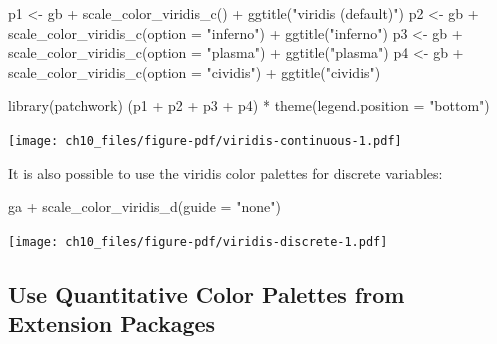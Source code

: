 \documentclass[
  letterpaper,
  DIV=11,
  numbers=noendperiod]{scrreprt}
\newenvironment{Shaded}{\begin{snugshade}}{\end{snugshade}}
\newcommand{\AttributeTok}[1]{\textcolor[rgb]{0.40,0.45,0.13}{#1}}
\newcommand{\FunctionTok}[1]{\textcolor[rgb]{0.28,0.35,0.67}{#1}}
\newcommand{\NormalTok}[1]{\textcolor[rgb]{0.00,0.23,0.31}{#1}}
\newcommand{\OtherTok}[1]{\textcolor[rgb]{0.00,0.23,0.31}{#1}}
\newcommand{\SpecialCharTok}[1]{\textcolor[rgb]{0.37,0.37,0.37}{#1}}
\newcommand{\StringTok}[1]{\textcolor[rgb]{0.13,0.47,0.30}{#1}}
\begin{document}
\begin{Shaded}
\begin{Highlighting}[]
\NormalTok{p1 }\OtherTok{\textless{}{-}}\NormalTok{ gb }\SpecialCharTok{+} \FunctionTok{scale\_color\_viridis\_c}\NormalTok{() }\SpecialCharTok{+} \FunctionTok{ggtitle}\NormalTok{(}\StringTok{"\textquotesingle{}viridis\textquotesingle{} (default)"}\NormalTok{)}
\NormalTok{p2 }\OtherTok{\textless{}{-}}\NormalTok{ gb }\SpecialCharTok{+} \FunctionTok{scale\_color\_viridis\_c}\NormalTok{(}\AttributeTok{option =} \StringTok{"inferno"}\NormalTok{) }\SpecialCharTok{+} \FunctionTok{ggtitle}\NormalTok{(}\StringTok{"\textquotesingle{}inferno\textquotesingle{}"}\NormalTok{)}
\NormalTok{p3 }\OtherTok{\textless{}{-}}\NormalTok{ gb }\SpecialCharTok{+} \FunctionTok{scale\_color\_viridis\_c}\NormalTok{(}\AttributeTok{option =} \StringTok{"plasma"}\NormalTok{) }\SpecialCharTok{+} \FunctionTok{ggtitle}\NormalTok{(}\StringTok{"\textquotesingle{}plasma\textquotesingle{}"}\NormalTok{)}
\NormalTok{p4 }\OtherTok{\textless{}{-}}\NormalTok{ gb }\SpecialCharTok{+} \FunctionTok{scale\_color\_viridis\_c}\NormalTok{(}\AttributeTok{option =} \StringTok{"cividis"}\NormalTok{) }\SpecialCharTok{+} \FunctionTok{ggtitle}\NormalTok{(}\StringTok{"\textquotesingle{}cividis\textquotesingle{}"}\NormalTok{)}

\FunctionTok{library}\NormalTok{(patchwork)}
\NormalTok{(p1 }\SpecialCharTok{+}\NormalTok{ p2 }\SpecialCharTok{+}\NormalTok{ p3 }\SpecialCharTok{+}\NormalTok{ p4) }\SpecialCharTok{*} \FunctionTok{theme}\NormalTok{(}\AttributeTok{legend.position =} \StringTok{"bottom"}\NormalTok{)}
\end{Highlighting}
\end{Shaded}

\texttt{[image: ch10\_files/figure-pdf/viridis-continuous-1.pdf]}

It is also possible to use the viridis color palettes for discrete
variables:

\begin{Shaded}
\begin{Highlighting}[]
\NormalTok{ga }\SpecialCharTok{+} \FunctionTok{scale\_color\_viridis\_d}\NormalTok{(}\AttributeTok{guide =} \StringTok{"none"}\NormalTok{)}
\end{Highlighting}
\end{Shaded}

\texttt{[image: ch10\_files/figure-pdf/viridis-discrete-1.pdf]}

\subsection{Use Quantitative Color Palettes from Extension
Packages}\label{use-quantitative-color-palettes-from-extension-packages}
\end{document}
